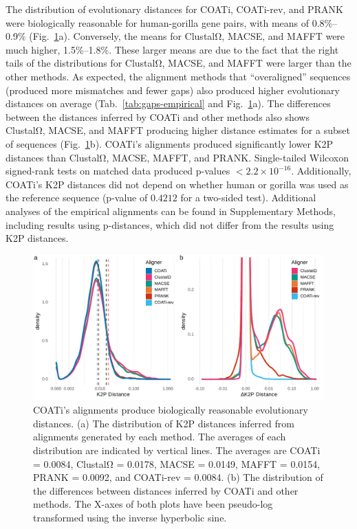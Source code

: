 \documentclass[12pt,letterpaper]{article}
\begin{document}
The distribution of evolutionary distances for COATi, COATi-rev, and PRANK were biologically reasonable for human-gorilla gene pairs, with means of 0.8\%--0.9\% (Fig.~\ref{fig:k2p-empirical}a). Conversely, the means for ClustalΩ, MACSE, and MAFFT were much higher, 1.5\%--1.8\%. These larger means are due to the fact that the right tails of the distributions for ClustalΩ, MACSE, and MAFFT were larger than the other methods. As expected, the alignment methods that ``overaligned'' sequences (produced more mismatches and fewer gaps) also produced higher evolutionary distances on average (Tab.~\ref{tab:gaps-empirical} and Fig.~\ref{fig:k2p-empirical}a). The differences between the distances inferred by COATi and other methods also shows ClustalΩ, MACSE, and MAFFT producing higher distance estimates for a subset of sequences (Fig.~\ref{fig:k2p-empirical}b).
%
COATi's alignments produced significantly lower K2P distances than ClustalΩ, MACSE, MAFFT, and PRANK. Single-tailed Wilcoxon signed-rank tests on matched data produced p-values $< 2.2\times10^{-16}$. Additionally, COATi's K2P distances did not depend on whether human or gorilla was used as the reference sequence (p-value of $0.4212$ for a two-sided test). Additional analyses of the empirical alignments can be found in Supplementary Methods, including results using p-distances, which did not differ from the results using K2P distances.


\begin{figure}[h!]
    \centering%
    \includegraphics{figures/fig-k2p-empirical.pdf}
    \par
    \caption{COATi's alignments produce biologically reasonable evolutionary distances. (a) The distribution of K2P distances inferred from alignments generated by each method. The averages of each distribution are indicated by vertical lines. The averages are COATi = 0.0084, ClustalΩ = 0.0178, MACSE = 0.0149, MAFFT = 0.0154, PRANK = 0.0092, and COATi-rev = 0.0084. (b) The distribution of the differences between distances inferred by COATi and other methods. The X-axes of both plots have been pseudo-log transformed using the inverse hyperbolic sine.\label{fig:k2p-empirical}}
\end{figure}
\end{document}

